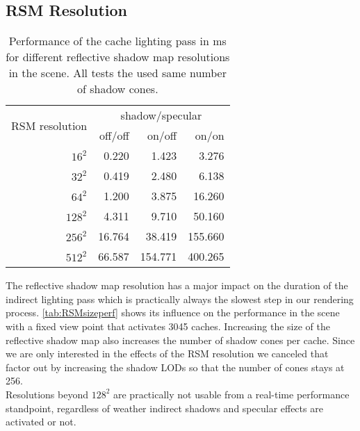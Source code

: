 \documentclass[thesis.tex]{subfiles}
\begin{document}
\subsection{RSM Resolution}
\begin{table}[h]
  \centering
    \begin{tabular}{r|rrr}
    \toprule
    \multirow{2}{*}{RSM resolution} & \multicolumn{3}{c}{ shadow/specular}\\
     & off/off & on/off & on/on \\
    \midrule
    $16^2$    & 0.220 & 1.423 & 3.276 \\
    $32^2$    & 0.419 & 2.480 & 6.138 \\
    $64^2$    & 1.200 & 3.875 & 16.260 \\
    $128^2$   & 4.311 & 9.710 & 50.160 \\
    $256^2$   & 16.764 & 38.419 & 155.660 \\
    $512^2$   & 66.587 & 154.771 & 400.265 \\
    \bottomrule
    \end{tabular}
\caption{Performance of the cache lighting pass in \si{\milli\second} for different reflective shadow map resolutions in the  scene. All tests the used same number of shadow cones. }
\label{tab:RSMsizeperf}
\end{table}
The reflective shadow map resolution has a major impact on the duration of the indirect lighting pass which is practically always the slowest step in our rendering process.
\autoref{tab:RSMsizeperf} shows its influence on the performance in the  scene with a fixed view point that activates 3045 caches.
Increasing the size of the reflective shadow map also increases the number of shadow cones per cache.
Since we are only interested in the effects of the RSM resolution we canceled that factor out by increasing the shadow LODs so that the number of cones stays at 256.
\\
Resolutions beyond $128^2$ are practically not usable from a real-time performance standpoint, regardless of weather indirect shadows and specular effects are activated or not.
\end{document}
